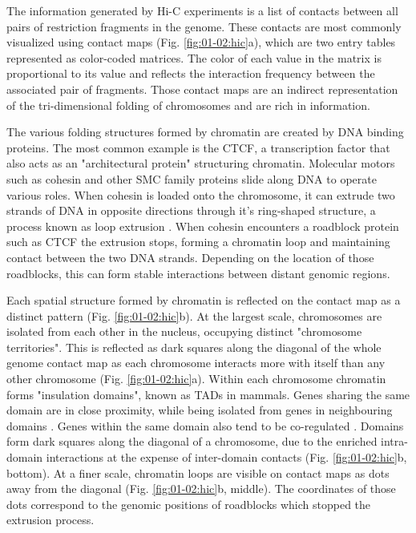 The information generated by Hi-C experiments is a list of contacts between all pairs of restriction fragments in the genome. These contacts are most commonly visualized using contact maps (Fig. \ref{fig:01-02:hic}a), which are two entry tables represented as color-coded matrices. The color of each value in the matrix is proportional to its value and reflects the interaction frequency between the associated pair of fragments. Those contact maps are an indirect representation of the tri-dimensional folding of chromosomes and are rich in information.

The various folding structures formed by chromatin are created by DNA binding proteins. The most common example is the \acrfull{CTCF}, a transcription factor that also acts as an "architectural protein" structuring chromatin. Molecular motors such as cohesin and other \acrfull{SMC} family proteins slide along DNA to operate various roles. When cohesin is loaded onto the chromosome, it can extrude two strands of DNA in opposite directions through it's ring-shaped structure, a process known as loop extrusion \cite{fudenbergFormationChromosomalDomains2016}. When cohesin encounters a roadblock protein such as \acrshort{CTCF} the extrusion stops, forming a chromatin loop and maintaining contact between the two DNA strands. Depending on the location of those roadblocks, this can form stable interactions between distant genomic regions. 

Each spatial structure formed by chromatin is reflected on the contact map as a distinct pattern (Fig. \ref{fig:01-02:hic}b). At the largest scale, chromosomes are isolated from each other in the nucleus, occupying distinct "chromosome territories". This is reflected as dark squares along the diagonal of the whole genome contact map as each chromosome interacts more with itself than any other chromosome (Fig. \ref{fig:01-02:hic}a). Within each chromosome chromatin forms "insulation domains", known as \acrfull{TAD}s in mammals. Genes sharing the same domain are in close proximity, while being isolated from genes in neighbouring domains . Genes within the same domain also tend to be co-regulated \cite{noraSpatialPartitioningRegulatory2012}. Domains form dark squares along the diagonal of a chromosome, due to the enriched intra-domain interactions at the expense of inter-domain contacts (Fig. \ref{fig:01-02:hic}b, bottom). At a finer scale, chromatin loops are visible on contact maps as dots away from the diagonal (Fig. \ref{fig:01-02:hic}b, middle). The coordinates of those dots correspond to the genomic positions of roadblocks which stopped the extrusion process.

